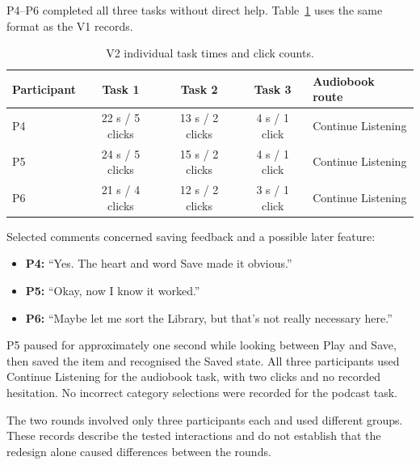 P4--P6 completed all three tasks without direct help. Table~\ref{tab:appendix-v2} uses the same format as the V1 records.

\begin{table}[!htbp]
  \centering
  \caption{V2 individual task times and click counts.}
  \label{tab:appendix-v2}
  \begingroup
  \small
  \renewcommand{\arraystretch}{1.3}
  \begin{tabular}{@{}lcccp{}@{}}
    \hline
    \textbf{Participant} & \textbf{Task 1} & \textbf{Task 2} & \textbf{Task 3} & \textbf{Audiobook route} \\
    \hline
    P4 & 22 s / 5 clicks & 13 s / 2 clicks & 4 s / 1 click & Continue Listening \\
    P5 & 24 s / 5 clicks & 15 s / 2 clicks & 4 s / 1 click & Continue Listening \\
    P6 & 21 s / 4 clicks & 12 s / 2 clicks & 3 s / 1 click & Continue Listening \\
    \hline
  \end{tabular}
  \endgroup
\end{table}

Selected comments concerned saving feedback and a possible later feature:

\begin{itemize}
  \setlength{\itemsep}{2pt}
  \setlength{\parsep}{0pt}
  \item \textbf{P4:} ``Yes. The heart and word Save made it obvious.''
  \item \textbf{P5:} ``Okay, now I know it worked.''
  \item \textbf{P6:} ``Maybe let me sort the Library, but that's not really necessary here.''
\end{itemize}

P5 paused for approximately one second while looking between Play and Save, then saved the item and recognised the Saved state. All three participants used Continue Listening for the audiobook task, with two clicks and no recorded hesitation. No incorrect category selections were recorded for the podcast task.

The two rounds involved only three participants each and used different groups. These records describe the tested interactions and do not establish that the redesign alone caused differences between the rounds.
